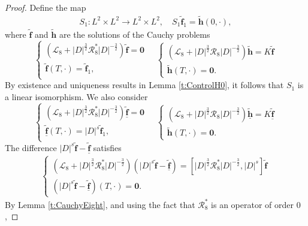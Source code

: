 \documentclass[12pt]{amsart}
\theoremstyle{remark}
\theoremstyle{definition}
\numberwithin{equation}{section}
\newcommand{\f}{\frac}
\newcommand{\mL}{\mathcal{L}}
\newcommand{\mR}{\mathcal{R}}
\begin{document}
\begin{proof}
Define the map 
\begin{align*}
S_1: L^2\times L^2 \rightarrow L^2\times L^2, \quad S_1\widetilde{\mathbf{f}}_1=\tilde{\mathbf{h}}(0,\cdot),
\end{align*}
where $\widetilde{\mathbf{f}}$  and  $\tilde{\mathbf{h}}$ are the solutions of the Cauchy problems
\begin{equation}\label{Col-Cauchy}
\begin{cases}
(\mL_8 + |D|^{\f32}\mR^*_8|D|^{-\f32})\widetilde{\mathbf{f}}=\mathbf{0}\\
\widetilde{\mathbf{f}}(T,\cdot)=\widetilde{\mathbf{f}}_1,\\
\end{cases}
\quad
\begin{cases}
(\mL_8 + |D|^{\f32}\mR_8|D|^{-\f32})\widetilde{\mathbf{h}}=K\widetilde{\mathbf{f}}\\
\widetilde{\mathbf{h}}(T,\cdot)= \mathbf{0}.
\end{cases}
\end{equation}
By existence and uniqueness results in Lemma \ref{t:ControlH0}, it follows that $S_1$ is a linear isomorphism. We also consider 
\begin{equation}\label{Col-Cauchy1}
\begin{cases}
(\mL_8 + |D|^{\f32}\mR^*_8|D|^{-\f32})\underline{\widetilde{\mathbf{f}}}= \mathbf{0}\\
\underline{\widetilde{\mathbf{f}}}(T,\cdot)=|D|^s\widetilde{\mathbf{f}}_1,\\
\end{cases}
\quad
\begin{cases}
(\mL_8 +|D|^{\f32}\mR_8|D|^{-\f32})\underline{\widetilde{\mathbf{h}}}=K\underline{\widetilde{\mathbf{f}}}\\
\widetilde{\mathbf{h}}(T,\cdot)= \mathbf{0}.
\end{cases}
\end{equation}
The difference $|D|^s\widetilde{\mathbf{f}}-\underline{\widetilde{\mathbf{f}}}$ satisfies
\begin{align*}
\begin{cases}
(\mL_8 +|D|^{\f32}\mR^*_8|D|^{-\f32})(|D|^s\widetilde{\mathbf{f}}-\underline{\widetilde{\mathbf{f}}})=[|D|^{\f32}\mR^*_8|D|^{-\f32},|D|^s]\widetilde{\mathbf{f}}\\
(|D|^s\widetilde{\mathbf{f}}-\underline{\widetilde{\mathbf{f}}})(T,\cdot)=\mathbf{0}.
\end{cases}
\end{align*}
By Lemma \ref{t:CauchyEight}, and using the fact that $\mR_8^*$ is an operator of order $0$,

\end{proof}
\end{document}
